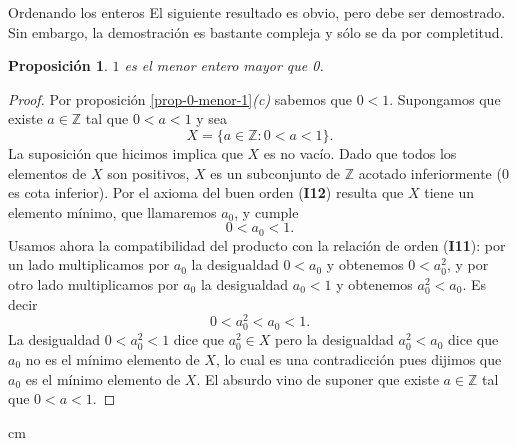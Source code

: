 \documentclass[11pt,spanish,makeidx]{amsbook}
\newtheorem{proposicion}[teorema]{Proposici\'on}
\theoremstyle{definition}
\theoremstyle{remark}
\begin{document}
\begin{section}{Ordenando los enteros}
El siguiente resultado es obvio, pero  debe ser demostrado. Sin embargo,  la demostración es bastante compleja y sólo se da por completitud. 
\begin{proposicion}
$1$ es el menor entero mayor que 0.
\end{proposicion}
\begin{proof}
Por proposición \ref{prop-0-menor-1}{\it (c)} sabemos que $0 < 1$. Supongamos que existe $a \in \mathbb Z$ tal que $0<a<1$ y sea 
$$
X=\{a\in\mathbb Z: 0<a<1\}.
$$
La  suposición que hicimos implica que $X$ es no vacío.  Dado que todos los elementos de $X$ son positivos, $X$ es un subconjunto de $\mathbb Z$ acotado inferiormente (0 es cota inferior). Por el axioma del buen orden (\textbf{I12}) resulta que $X$ tiene un elemento mínimo, que llamaremos $a_0$, y cumple
$$
0<a_0<1. 
$$
Usamos ahora la compatibilidad del  producto con  la relación de orden (\textbf{I11}):  por un lado multiplicamos por $a_0$ la desigualdad $0<a_0$ y obtenemos $0<a_0^2$,  y por otro lado multiplicamos por $a_0$ la desigualdad $a_0<1$ y obtenemos $a_0^2<a_0$. Es decir
$$
 0<a_0^2<a_0<1.
$$
La desigualdad $0<a_0^2<1$ dice que $a_0^2\in X$ pero la desigualdad $a_0^2<a_0$ dice que  $a_0$ no es el mínimo elemento de $X$, lo cual es una contradicción pues dijimos que $a_0$ es el mínimo elemento de $X$.  El  absurdo  vino de suponer que existe $a \in \mathbb Z$ tal que   $0<a<1$.
\end{proof}

 cm


\end{section}
\end{document}
